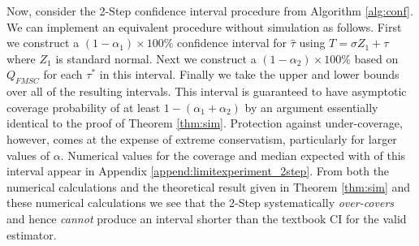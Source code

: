 Now, consider the 2-Step confidence interval procedure from Algorithm \ref{alg:conf}.
We can implement an equivalent procedure without simulation as follows.
First we construct a $(1-\alpha_1)\times 100\%$ confidence interval for $\widehat{\tau}$ using $T = \sigma Z_1 + \tau$ where $Z_1$ is standard normal.
Next we construct a $(1-\alpha_2)\times 100\%$ based on $Q_{FMSC}$ for each $\tau^*$ in this interval.
Finally we take the upper and lower bounds over all of the resulting intervals.
This interval is guaranteed to have asymptotic coverage probability of at least $1 - (\alpha_1 + \alpha_2)$ by an argument essentially identical to the proof of Theorem \ref{thm:sim}.
Protection against under-coverage, however, comes at the expense of extreme conservatism, particularly for larger values of $\alpha$.
Numerical values for the coverage and median expected with of this interval appear in Appendix \ref{append:limitexperiment_2step}. 
From both the numerical calculations and the theoretical result given in Theorem \ref{thm:sim} and these numerical calculations we see that the 2-Step systematically \emph{over-covers} and hence \emph{cannot} produce an interval shorter than the textbook CI for the valid estimator.

